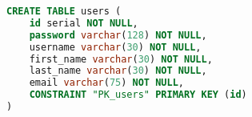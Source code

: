 \begin{lstlisting}[language=SQL,caption={ASP.NET Core Table creation \acrshort{sql} command},breaklines=true,label={lst:sqlCreateTable}]
CREATE TABLE users (
    id serial NOT NULL,
    password varchar(128) NOT NULL,
    username varchar(30) NOT NULL,
    first_name varchar(30) NOT NULL,
    last_name varchar(30) NOT NULL,
    email varchar(75) NOT NULL,
    CONSTRAINT "PK_users" PRIMARY KEY (id)
)
\end{lstlisting}
